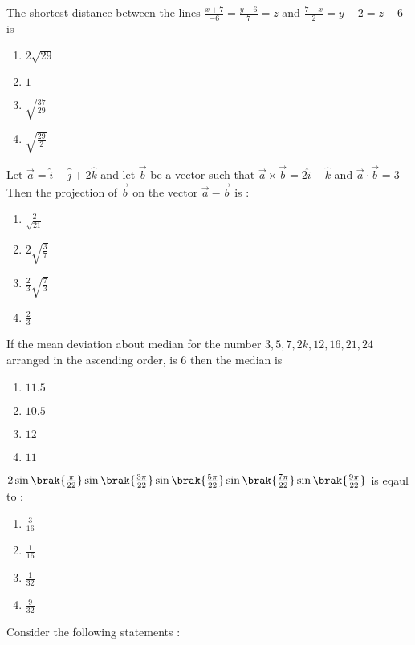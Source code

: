 
\iffalse
  \title{2022}
  \author{EE24BTECH11043}
  \section{mcq-single}
\fi
\item The shortest distance between the lines $\frac{x+7}{-6} = \frac{y-6}{7} = z$ and $\frac{7-x}{2} = y-2 = z-6$ is \hfill{}
\begin{enumerate}
\item $2\sqrt{29}$
\item $1$
\item $\sqrt{\frac{37}{29}}$
\item $\sqrt{\frac{29}{2}}$
\end{enumerate}
\item Let $\vec{a} = \hat{i}-\hat{j}+2\hat{k}$ and let $\vec{b}$ be a vector such that $\vec{a} \times \vec{b} = 2\hat{i}-\hat{k}$ and $\vec{a} \cdot \vec{b} = 3$ Then the projection of $\vec{b}$ on the vector $\vec{a}-\vec{b}$ is : \hfill{}
\begin{enumerate}
\item $\frac{2}{\sqrt{21}}$
\item $2\sqrt{\frac{3}{7}}$
\item $\frac{2}{3}\sqrt{\frac{7}{3}}$
\item $\frac{2}{3}$
\end{enumerate}
\item If the mean deviation about median for the number $3,5,7,2k,12,16,21,24$ arranged in the ascending order, is 6 then the median is \hfill{}
\begin{enumerate}
\item $11.5$
\item $10.5$
\item $12$
\item $11$
\end{enumerate}
\item $2\sin\brak{\frac{\pi}{22}}\sin\brak{\frac{3\pi}{22}}\sin\brak{\frac{5\pi}{22}}\sin\brak{\frac{7\pi}{22}}\sin\brak{\frac{9\pi}{22}}$ is eqaul to : \hfill{}
\begin{enumerate}
\item $\frac{3}{16}$
\item $\frac{1}{16}$
\item $\frac{1}{32}$
\item $\frac{9}{32}$
\end{enumerate}
\item Consider the following statements : \hfill{}\\
